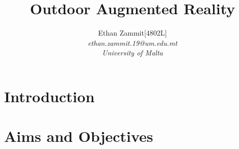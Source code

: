 \documentclass{article}
\title{Outdoor Augmented Reality}
\begin{document}
\author{{Ethan Zammit[4802L]}\\
\textit{ethan.zammit.19@um.edu.mt}\\
\textit{University of Malta}}



\maketitle



  \section{Introduction}
    

  \section{Aims and Objectives}
       





\end{document}
